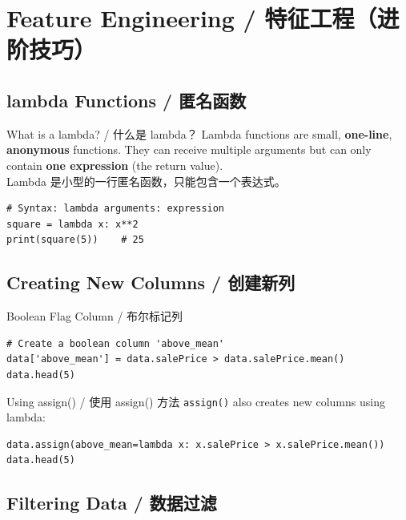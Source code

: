 \documentclass[11pt,a4paper]{report}
\let\oldtexttt\texttt
\renewcommand{\texttt}[1]{\textcolor{mainblue}{\oldtexttt{#1}}}
\begin{document}
\section{Feature Engineering / 特征工程（进阶技巧）}

\subsection{lambda Functions / 匿名函数}

\begin{concept}{What is a lambda? / 什么是 lambda？}
    Lambda functions are small, \textbf{one-line}, \textbf{anonymous} functions. They can receive multiple arguments but can only contain \textbf{one expression} (the return value). \\
    Lambda 是小型的一行匿名函数，只能包含一个表达式。

    \begin{lstlisting}
# Syntax: lambda arguments: expression
square = lambda x: x**2
print(square(5))    # 25
    \end{lstlisting}
\end{concept}

\subsection{Creating New Columns / 创建新列}

\begin{examplebox}{Boolean Flag Column / 布尔标记列}
\begin{lstlisting}
# Create a boolean column 'above_mean'
data['above_mean'] = data.salePrice > data.salePrice.mean()
data.head(5)
\end{lstlisting}
\end{examplebox}

\begin{examplebox}{Using assign() / 使用 assign() 方法}
    \texttt{assign()} also creates new columns using lambda:
\begin{lstlisting}
data.assign(above_mean=lambda x: x.salePrice > x.salePrice.mean())
data.head(5)
\end{lstlisting}
\end{examplebox}

\subsection{Filtering Data / 数据过滤}
\end{document}
